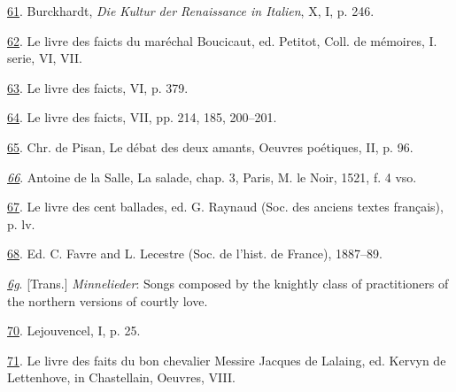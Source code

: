 \protect\hypertarget{23_NOTES.xhtmlux5cux23id_1812}{\protect\hyperlink{10_Chapter_Three__THE_HEROIC_DREAM.xhtmlux5cux23id_1811}{61}}.
Burckhardt, \emph{Die Kultur der Renaissance in Italien}, X, I, p. 246.

\protect\hypertarget{23_NOTES.xhtmlux5cux23id_1810}{\protect\hyperlink{10_Chapter_Three__THE_HEROIC_DREAM.xhtmlux5cux23id_1809}{62}}.
Le livre des faicts du maréchal Boucicaut, ed. Petitot, Coll. de
mémoires, I. serie, VI, VII.

\protect\hypertarget{23_NOTES.xhtmlux5cux23id_1808}{\protect\hyperlink{10_Chapter_Three__THE_HEROIC_DREAM.xhtmlux5cux23id_1807}{63}}.
Le livre des faicts, VI, p. 379.

\protect\hypertarget{23_NOTES.xhtmlux5cux23id_1806}{\protect\hyperlink{10_Chapter_Three__THE_HEROIC_DREAM.xhtmlux5cux23id_1805}{64}}.
Le livre des faicts, VII, pp. 214, 185, 200--201.

\protect\hypertarget{23_NOTES.xhtmlux5cux23id_1804}{\protect\hyperlink{10_Chapter_Three__THE_HEROIC_DREAM.xhtmlux5cux23id_1803}{65}}.
Chr. de Pisan, Le débat des deux amants, Oeuvres poétiques, II, p. 96.

\emph{\protect\hypertarget{23_NOTES.xhtmlux5cux23page_407}{\protect\hyperlink{10_Chapter_Three__THE_HEROIC_DREAM.xhtmlux5cux23id_1802}{66}}}.
Antoine de la Salle, La salade, chap. 3, Paris, M. le Noir, 1521, f. 4
vso.

\protect\hypertarget{23_NOTES.xhtmlux5cux23id_1801}{\protect\hyperlink{10_Chapter_Three__THE_HEROIC_DREAM.xhtmlux5cux23id_1800}{67}}.
Le livre des cent ballades, ed. G. Raynaud (Soc. des anciens textes
français), p. lv.

\protect\hypertarget{23_NOTES.xhtmlux5cux23id_1799}{\protect\hyperlink{10_Chapter_Three__THE_HEROIC_DREAM.xhtmlux5cux23id_1798}{68}}.
Ed. C. Favre and L. Lecestre (Soc. de l'hist. de France), 1887--89.

\emph{\protect\hypertarget{23_NOTES.xhtmlux5cux23id_1797}{\protect\hyperlink{10_Chapter_Three__THE_HEROIC_DREAM.xhtmlux5cux23id_1796}{6g}}}.
{[}Trans.{]} \emph{Minnelieder}: Songs composed by the knightly class of
practitioners of the northern versions of courtly love.

\protect\hypertarget{23_NOTES.xhtmlux5cux23id_1795}{\protect\hyperlink{10_Chapter_Three__THE_HEROIC_DREAM.xhtmlux5cux23id_1794}{70}}.
Lejouvencel, I, p. 25.

\protect\hypertarget{23_NOTES.xhtmlux5cux23id_1793}{\protect\hyperlink{10_Chapter_Three__THE_HEROIC_DREAM.xhtmlux5cux23id_1792}{71}}.
Le livre des faits du bon chevalier Messire Jacques de Lalaing, ed.
Kervyn de Lettenhove, in Chastellain, Oeuvres, VIII.

